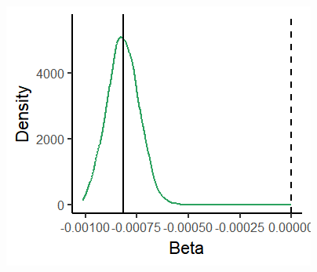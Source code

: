 \documentclass[xcolor=x11names,compress]{beamer}\usepackage[]{graphicx}\usepackage[]{color}
\makeatletter
\def\maxwidth{ %
  \ifdim\Gin@nat@width>\linewidth
    \linewidth
  \else
    \Gin@nat@width
  \fi
}
\newenvironment{knitrout}{}{} %
\renewcommand{\(}{\begin{columns}}
\renewcommand{\)}{\end{columns}}
\newcommand{\<}[1]{\begin{column}{#1}}
\renewcommand{\>}{\end{column}}
\makeatother
\begin{document}
\begin{frame}
\begin{multicols}{2}
\columnbreak
\begin{knitrout}
\color{fgcolor}
\includegraphics[width=\maxwidth]{figure/beta_dist-1} 

\end{knitrout}
\end{multicols}
\end{frame}
\end{document}
